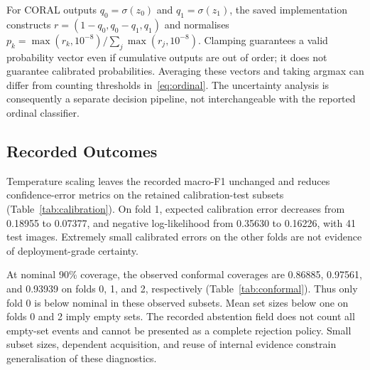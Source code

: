 For CORAL outputs $q_0=\sigma(z_0)$ and $q_1=\sigma(z_1)$, the saved implementation constructs $r=(1-q_0,q_0-q_1,q_1)$ and normalises $p_k=\max(r_k,10^{-8})/\sum_j\max(r_j,10^{-8})$. Clamping guarantees a valid probability vector even if cumulative outputs are out of order; it does not guarantee calibrated probabilities. Averaging these vectors and taking argmax can differ from counting thresholds in~\eqref{eq:ordinal}. The uncertainty analysis is consequently a separate decision pipeline, not interchangeable with the reported ordinal classifier.

\subsection{Recorded Outcomes}
Temperature scaling leaves the recorded macro-F1 unchanged and reduces confidence-error metrics on the retained calibration-test subsets (Table~\ref{tab:calibration}). On fold 1, expected calibration error decreases from 0.18955 to 0.07377, and negative log-likelihood from 0.35630 to 0.16226, with 41 test images. Extremely small calibrated errors on the other folds are not evidence of deployment-grade certainty.

At nominal 90\% coverage, the observed conformal coverages are 0.86885, 0.97561, and 0.93939 on folds 0, 1, and 2, respectively (Table~\ref{tab:conformal}). Thus only fold 0 is below nominal in these observed subsets. Mean set sizes below one on folds 0 and 2 imply empty sets. The recorded abstention field does not count all empty-set events and cannot be presented as a complete rejection policy. Small subset sizes, dependent acquisition, and reuse of internal evidence constrain generalisation of these diagnostics.




